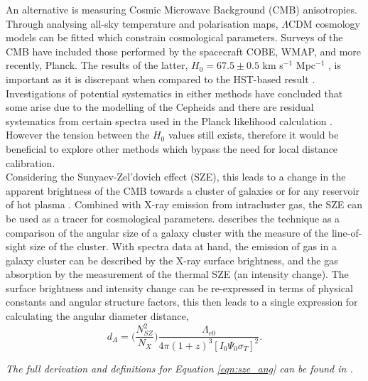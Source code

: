 \documentclass[12pt, onecolumn]{revtex4}    %
\begin{document}
An alternative is measuring Cosmic Microwave Background (CMB) anisotropies. Through analysing all-sky temperature and polarisation maps, $\Lambda$CDM cosmology models can be fitted which constrain cosmological parameters. Surveys of the CMB have included those performed by the spacecraft COBE, WMAP, and more recently, Planck. The results of the latter, $H_0=67.5\pm0.5$ km s$^{-1}$ Mpc$^{-1}$ \citep{2018arXiv180706209P}, is important as it is discrepant when compared to the HST-based result \citep{2018ApJ...855..136R}. Investigations of potential systematics in either methods have concluded that some arise due to the modelling of the Cepheids \citep{2018MNRAS.477.4534F} and there are residual systematics from certain spectra used in the Planck likelihood calculation \citep{2015PhRvD..91b3518S}. However the tension between the $H_0$ values still exists, therefore it would be beneficial to explore other methods which bypass the need for local distance calibration. \\

Considering the Sunyaev-Zel'dovich effect (SZE), this leads to a change in the apparent brightness of the CMB towards a cluster of galaxies or for any reservoir of hot plasma \citep{1999PhR...310...97B, 2002ARA&A..40..643C}. Combined with X-ray emission from intracluster gas, the SZE can be used as a tracer for cosmological parameters. \cite{1999PhR...310...97B} describes the technique as a comparison of the angular size of a galaxy cluster with the measure of the line-of-sight size of the cluster. With spectra data at hand, the emission of gas in a galaxy cluster can be described by the X-ray surface brightness, and the gas absorption by the measurement of the thermal SZE (an intensity change).  The surface brightness and intensity change can be re-expressed in terms of physical constants and angular structure factors, this then leads to a single expression for calculating the angular diameter distance, 
\begin{equation}
d_A = \Bigg( \frac{N^2_{SZ}}{N_X} \Bigg)\frac{\Lambda_{e0}}{4\pi (1+z)^3 [I_0 \Psi_0 \sigma_T]^2}.
\label{eqn:sze_ang}
\end{equation}

\textit{The full derivation and definitions for Equation \ref{eqn:sze_ang} can be found in \cite{1997ApJ...480..449H}.} \\
\end{document}
